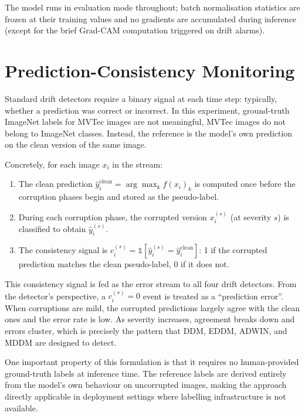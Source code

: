 The model runs in evaluation mode throughout; batch normalisation statistics are frozen at their training values and no gradients are accumulated during inference (except for the brief Grad-CAM computation triggered on drift alarms).

\section{Prediction-Consistency Monitoring}
\label{sec:consistency}

Standard drift detectors require a binary signal at each time step: typically, whether a prediction was correct or incorrect. In this experiment, ground-truth ImageNet labels for MVTec images are not meaningful, MVTec images do not belong to ImageNet classes. Instead, the reference is the model's own prediction on the clean version of the same image.

Concretely, for each image $x_i$ in the stream:

\begin{enumerate}
  \item The clean prediction $\hat{y}_i^{\text{clean}} = \arg\max_k f(x_i)_k$ is computed once before the corruption phases begin and stored as the pseudo-label.
  \item During each corruption phase, the corrupted version $x_i^{(s)}$ (at severity $s$) is classified to obtain $\hat{y}_i^{(s)}$.
  \item The consistency signal is $c_i^{(s)} = \mathbb{1}[\hat{y}_i^{(s)} = \hat{y}_i^{\text{clean}}]$: 1 if the corrupted prediction matches the clean pseudo-label, 0 if it does not.
\end{enumerate}

This consistency signal is fed as the error stream to all four drift detectors. From the detector's perspective, a $c_i^{(s)} = 0$ event is treated as a ``prediction error''. When corruptions are mild, the corrupted predictions largely agree with the clean ones and the error rate is low. As severity increases, agreement breaks down and errors cluster, which is precisely the pattern that DDM, EDDM, ADWIN, and MDDM are designed to detect.

One important property of this formulation is that it requires no human-provided ground-truth labels at inference time. The reference labels are derived entirely from the model's own behaviour on uncorrupted images, making the approach directly applicable in deployment settings where labelling infrastructure is not available.

